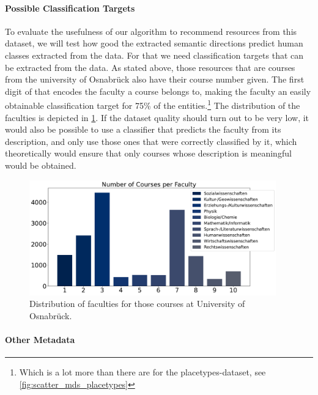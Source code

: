 \paragraph{Possible Classification Targets}

To evaluate the usefulness of our algorithm to recommend resources from this dataset, we will test how good the extracted semantic directions predict human classes extracted from the data. For that we need classification targets that can be extracted from the data. As stated above, those resources that are courses from the university of Osnabrück also have their course number given. The first digit of that encodes the faculty a course belongs to, making the faculty an easily obtainable classification target for 75\% of the entities.\footnote{Which is a lot more than there are for the placetypes-dataset, see \autoref{fig:scatter_mds_placetypes}} The distribution of the faculties is depicted in \ref{fig:courses_per_faculty}. If the dataset quality should turn out to be very low, it would also be possible to use a classifier that predicts the faculty from its description, and only use those ones that were correctly classified by it, which theoretically would ensure that only courses whose description is meaningful would be obtained. 

\begin{figure}[h]
	\centering
	\includegraphics[width=0.95\textwidth]{graphics/dataset_new/courses_per_faculty.pdf}
	\caption{Distribution of faculties for those courses at University of Osnabrück.}
	\label{fig:courses_per_faculty}
\end{figure}

\paragraph{Other Metadata}

